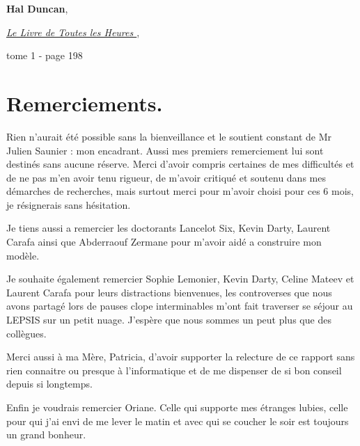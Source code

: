 \documentclass[a4paper,11pt]{article}
\begin{document}
\hfill \textbf{Hal Duncan}, 

\hfill \textit{ \underline{ Le Livre de Toutes les Heures } }, %

\hfill tome 1 - page 198

\newpage
\section*{Remerciements.}

\vspace{1cm}

\begin{large}

Rien n'aurait été possible sans la bienveillance et le soutient constant de Mr Julien Saunier : mon encadrant. Aussi mes premiers remerciement lui sont destinés sans aucune réserve. Merci d'avoir compris certaines de mes difficultés et de ne pas m'en avoir tenu rigueur, de m'avoir critiqué et soutenu dans mes démarches de recherches, mais surtout merci pour m'avoir choisi pour ces 6 mois, je résignerais sans hésitation. 

\vspace{1cm}

Je tiens aussi a remercier les doctorants Lancelot Six, Kevin Darty, Laurent Carafa ainsi que Abderraouf Zermane  pour m'avoir aidé a construire mon modèle.

\vspace{1cm}

Je souhaite également remercier Sophie Lemonier, Kevin Darty, Celine Mateev et Laurent Carafa pour leurs distractions bienvenues, les controverses que nous avons partagé lors de pauses clope interminables m'ont fait traverser se séjour au LEPSIS sur un petit nuage. J'espère que nous sommes un peut plus que des collègues.

\vspace{1cm}

Merci aussi à ma Mère, Patricia, d'avoir supporter la relecture de ce rapport sans rien connaitre ou presque à l'informatique et de me dispenser de si bon conseil depuis si longtemps.

\vspace{1cm}

Enfin je voudrais remercier Oriane. Celle qui supporte mes étranges lubies, celle pour qui j'ai envi de me lever le matin et avec qui se coucher le soir est toujours un grand bonheur.

\end{large}
\end{document}

